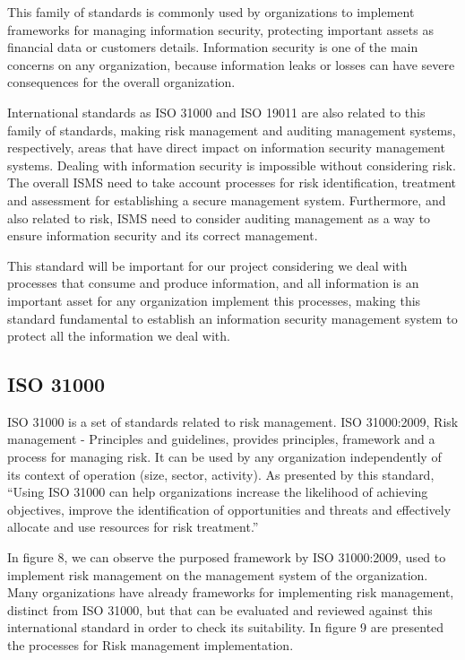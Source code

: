 This family of standards is commonly used by organizations to implement frameworks for managing information security, protecting important assets as financial data or customers details. Information security is one of the main concerns on any organization, because information leaks or losses can have severe consequences for the overall organization.\par
International standards as ISO 31000 and ISO 19011 are also related to this family of standards, making risk management and auditing management systems, respectively, areas that have direct impact on information security management systems. Dealing with information security is impossible without considering risk. The overall ISMS need to take account processes for risk identification, treatment and assessment for establishing a secure management system. Furthermore, and also related to risk, ISMS need to consider auditing management as a way to ensure information security and its correct management.\par

This standard will be important for our project considering we deal with processes that consume and produce information, and all information is an important asset for any organization implement this processes, making this standard fundamental to establish an information security management system to protect all the information we deal with.\par



\subsection{ISO 31000}

ISO 31000 is a set of standards related to risk management. ISO 31000:2009, Risk management - Principles and guidelines, provides principles, framework and a process for managing risk. It can be used by any organization independently of its context of operation (size, sector, activity). As presented by this standard, ``Using ISO 31000 can help organizations increase the likelihood of achieving objectives, improve the identification of opportunities and threats and effectively allocate and use resources for risk treatment.''\cite{ISO31000}\par
In figure 8, we can observe the purposed framework by ISO 31000:2009, used to implement risk management on the management system of the organization. Many organizations have already frameworks for implementing risk management, distinct from ISO 31000, but that can be evaluated and reviewed against this international standard in order to check its suitability. In figure 9 are presented the processes for Risk management implementation.\par

